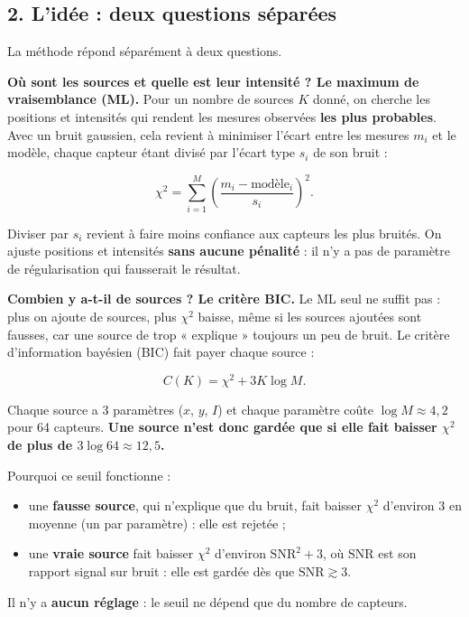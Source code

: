 \documentclass[
  french,
]{article}
\providecommand{\tightlist}{%
  \setlength{\itemsep}{0pt}\setlength{\parskip}{0pt}}
\begin{document}
\subsection{2. L'idée : deux questions
séparées}\label{liduxe9e-deux-questions-suxe9paruxe9es}

La méthode répond séparément à deux questions.

\textbf{Où sont les sources et quelle est leur intensité ? Le maximum de
vraisemblance (ML).} Pour un nombre de sources \(K\) donné, on cherche
les positions et intensités qui rendent les mesures observées
\textbf{les plus probables}. Avec un bruit gaussien, cela revient à
minimiser l'écart entre les mesures \(m_i\) et le modèle, chaque capteur
étant divisé par l'écart type \(s_i\) de son bruit :

\[
\chi^2 = \sum_{i=1}^{M}\left(\frac{m_i - \text{modèle}_i}{s_i}\right)^2 .
\]

Diviser par \(s_i\) revient à faire moins confiance aux capteurs les
plus bruités. On ajuste positions et intensités \textbf{sans aucune
pénalité} : il n'y a pas de paramètre de régularisation qui fausserait
le résultat.

\textbf{Combien y a-t-il de sources ? Le critère BIC.} Le ML seul ne
suffit pas : plus on ajoute de sources, plus \(\chi^2\) baisse, même si
les sources ajoutées sont fausses, car une source de trop « explique »
toujours un peu de bruit. Le critère d'information bayésien (BIC) fait
payer chaque source :

\[
C(K) = \chi^2 + 3K\log M .
\]

Chaque source a 3 paramètres (\(x\), \(y\), \(I\)) et chaque paramètre
coûte \(\log M\approx 4{,}2\) pour 64 capteurs. \textbf{Une source n'est
donc gardée que si elle fait baisser \(\chi^2\) de plus de
\(3\log 64\approx 12{,}5\).}

Pourquoi ce seuil fonctionne :

\begin{itemize}
\tightlist
\item
  une \textbf{fausse source}, qui n'explique que du bruit, fait baisser
  \(\chi^2\) d'environ 3 en moyenne (un par paramètre) : elle est
  rejetée ;
\item
  une \textbf{vraie source} fait baisser \(\chi^2\) d'environ
  \(\mathrm{SNR}^2 + 3\), où \(\mathrm{SNR}\) est son rapport signal sur
  bruit : elle est gardée dès que \(\mathrm{SNR}\gtrsim 3\).
\end{itemize}

Il n'y a \textbf{aucun réglage} : le seuil ne dépend que du nombre de
capteurs.
\end{document}
